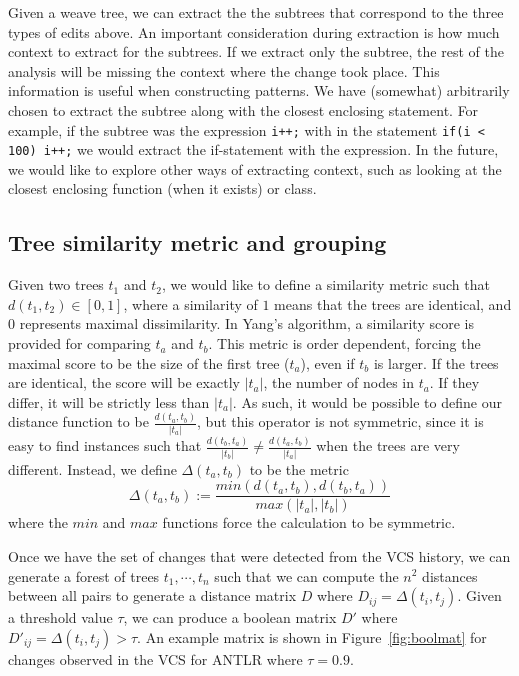 Given a weave tree, we can extract the the subtrees that correspond to the
three types of edits above.  An important consideration during extraction is
how much context to extract for the subtrees. If we extract only the subtree,
the rest of the analysis will be missing the context where the change took
place. This information is useful when constructing patterns. We have
(somewhat) arbitrarily chosen to extract the subtree along with the closest
enclosing statement. For example, if the subtree was the expression {\tt i++;}
with in the statement {\tt if(i < 100) i++;} we would extract the if-statement
with the expression. In the future, we would like to explore other ways of
extracting context, such as looking at the closest enclosing function (when it
exists) or class.

\subsection{Tree similarity metric and grouping}

Given two trees $t_1$ and $t_2$, we would like to define a similarity metric
such that $d(t_1, t_2) \in [0,1]$, where a similarity of $1$ means that the
trees are identical, and $0$ represents maximal dissimilarity.  In Yang's
algorithm, a similarity score is provided for comparing $t_a$ and $t_b$. This
metric is order dependent, forcing the maximal score to be the size of the
first tree ($t_a$), even if $t_b$ is larger.  If the trees are identical, the
score will be exactly $|t_a|$, the number of nodes in $t_a$.  If they differ,
it will be strictly less than $|t_a|$.  As such, it would be possible to define
our distance function to be $\frac{d(t_a, t_b)}{|t_a|}$, but this operator is
not symmetric, since it is easy to find instances such that $\frac{d(t_b,
t_a)}{|t_b|} \neq \frac{d(t_a, t_b)}{|t_a|}$ when the trees are very different.
Instead, we define $\Delta(t_a, t_b)$ to be the metric
$$\Delta(t_a, t_b) := \frac{min(d(t_a, t_b),d(t_b, t_a))}{max(|t_a|,|t_b|)}$$
where the $min$ and $max$ functions force the calculation to be symmetric.

Once we have the set of changes that were detected from the VCS history,
we can generate a forest of trees $t_1, \cdots, t_n$ such that we can
compute the $n^2$ distances between all pairs to generate a distance matrix
$D$ where $D_{ij} = \Delta(t_i, t_j)$.  Given a threshold value $\tau$, we can
produce a boolean matrix $D'$ where $D'_{ij} = \Delta(t_i, t_j) > \tau$.  An
example matrix is shown in Figure~\ref{fig:boolmat} for changes observed
in the VCS for ANTLR where $\tau = 0.9$.  

